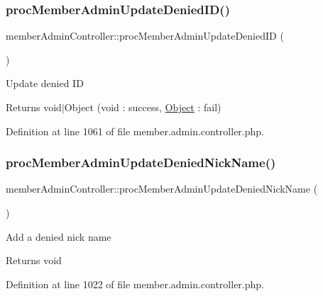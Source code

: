 \hypertarget{classmemberAdminController_a469f2b07b7c5adffc62c9dbf71680d32}{}\label{classmemberAdminController_a469f2b07b7c5adffc62c9dbf71680d32} 
\subsubsection{\texorpdfstring{proc\+Member\+Admin\+Update\+Denied\+I\+D()}{procMemberAdminUpdateDeniedID()}}
{\footnotesize\ttfamily member\+Admin\+Controller\+::proc\+Member\+Admin\+Update\+Denied\+ID (\begin{DoxyParamCaption}{ }\end{DoxyParamCaption})}

Update denied ID \begin{DoxyReturn}{Returns}
void$\vert$\+Object (void \+: success, \hyperlink{classObject}{Object} \+: fail) 
\end{DoxyReturn}


Definition at line 1061 of file member.\+admin.\+controller.\+php.

\hypertarget{classmemberAdminController_aa24edd8acdc15ea463a721b0dd3afe45}{}\label{classmemberAdminController_aa24edd8acdc15ea463a721b0dd3afe45} 
\subsubsection{\texorpdfstring{proc\+Member\+Admin\+Update\+Denied\+Nick\+Name()}{procMemberAdminUpdateDeniedNickName()}}
{\footnotesize\ttfamily member\+Admin\+Controller\+::proc\+Member\+Admin\+Update\+Denied\+Nick\+Name (\begin{DoxyParamCaption}{ }\end{DoxyParamCaption})}

Add a denied nick name \begin{DoxyReturn}{Returns}
void 
\end{DoxyReturn}


Definition at line 1022 of file member.\+admin.\+controller.\+php.

